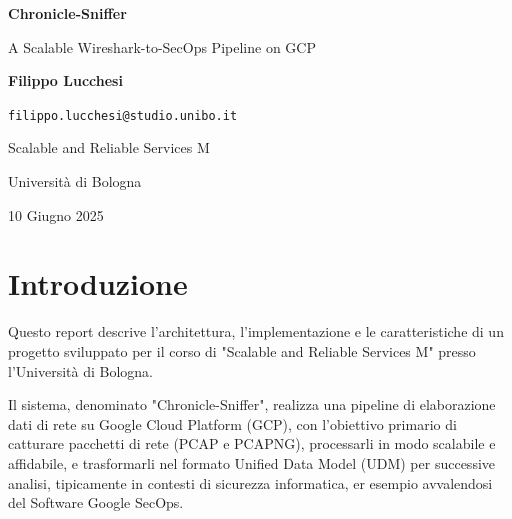 \documentclass[11pt, a4paper]{article}
\begin{document}
\begin{titlepage}
    \centering
    \null\vfill
    {\Huge\bfseries Chronicle-Sniffer\par}
    \vspace{1em}
    {\LARGE A Scalable Wireshark-to-SecOps Pipeline on GCP\par}
    \vspace{3em}
    {\Large\bfseries Filippo Lucchesi\par}
    {\large \texttt{filippo.lucchesi@studio.unibo.it}\par}
    \vspace{2em} 
    {\large Scalable and Reliable Services M\par}
    {\large Università di Bologna\par}
    \vspace{1em}
    {\large 10 Giugno 2025\par} %
    \vfill\null
\end{titlepage}

\thispagestyle{empty}
\clearpage
\tableofcontents
\clearpage
\pagestyle{fancy}


\section{Introduzione}
\label{sec:introduzione}

Questo report descrive l'architettura, l'implementazione e le caratteristiche di un progetto sviluppato per il corso di "Scalable and Reliable Services M" presso l'Università di Bologna. 

Il sistema, denominato "Chronicle-Sniffer", realizza una pipeline di elaborazione dati di rete su Google Cloud Platform (GCP), con l'obiettivo primario di catturare pacchetti di rete (PCAP e PCAPNG), processarli in modo scalabile e affidabile, e trasformarli nel formato Unified Data Model (UDM) per successive analisi, tipicamente in contesti di sicurezza informatica, er esempio avvalendosi del Software Google SecOps.
\end{document}
